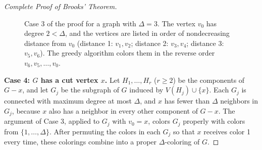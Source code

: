 \documentclass{article}
\theoremstyle{definition}
\begin{document}
\begin{proof}[Complete Proof of Brooks' Theorem]
\begin{figure}[ht]
\caption{Case 3 of the proof for a graph with $\Delta = 3$. The vertex $v_0$ has degree $2 < \Delta$, and the vertices are listed in order of nondecreasing distance from $v_0$ (distance 1: $v_1, v_2$; distance 2: $v_3, v_4$; distance 3: $v_5, v_6$). The greedy algorithm colors them in the reverse order $v_6, v_5, \ldots, v_0$.}
\label{fig:brooks-case3}
\end{figure}

\textbf{Case 4: $G$ has a cut vertex $x$.} Let $H_1, \ldots, H_r$ ($r \geq 2$) be the components of $G - x$, and let $G_j$ be the subgraph of $G$ induced by $V(H_j) \cup \{x\}$. Each $G_j$ is connected with maximum degree at most $\Delta$, and $x$ has fewer than $\Delta$ neighbors in $G_j$, because $x$ also has a neighbor in every other component of $G - x$. The argument of Case 3, applied to $G_j$ with $v_0 = x$, colors $G_j$ properly with colors from $\{1, \ldots, \Delta\}$. After permuting the colors in each $G_j$ so that $x$ receives color 1 every time, these colorings combine into a proper $\Delta$-coloring of $G$.


\end{proof}
\end{document}
